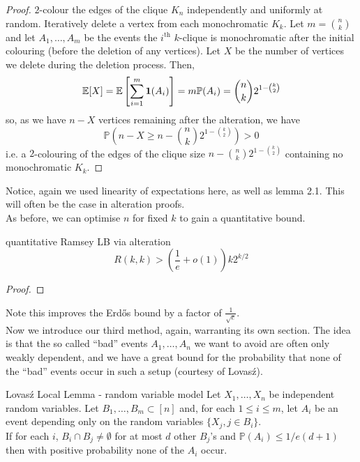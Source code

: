 \documentclass{article}
\begin{document}
\begin{proof}
    $2$-colour the edges of the clique $K_n$ independently and uniformly at random. Iteratively delete a vertex 
    from each monochromatic $K_k$. Let $m = \binom{n}{k}$ and let $A_1, \dots, A_m$ be the events the $i^\text{th}$ 
    $k$-clique is monochromatic after the initial colouring (before the deletion of any vertices). Let $X$ be the 
    number of vertices we delete during the deletion process. Then, 
    \[\mathbb{E}[X] = \mathbb{E}\left[\sum_{i = 1}^m {\bf 1}(A_i)\right] = m\mathbb{P}(A_i) = \binom{n}{k}2^{1-\binom{k}{2}}\]
    so, as we have $n - X$ vertices remaining after the alteration, we have 
    \[\mathbb{P}\left(n - X \geq n - \binom{n}{k}2^{1-\binom{k}{2}}\right) > 0\]
    i.e. a $2$-colouring of the edges of the clique size $n - \binom{n}{k}2^{1-\binom{k}{2}}$ containing no monochromatic 
    $K_k$. 
\end{proof}

Notice, again we used linearity of expectations here, as well as lemma 2.1. This will often be the case in 
alteration proofs. \\ 

As before, we can optimise $n$ for fixed $k$ to gain a quantitative bound.

\begin{proposition}[]{quantitative Ramsey LB via alteration}
    \[R(k, k) > \left(\frac{1}{e} + o(1)\right)k2^{k/2}\]
\end{proposition}

\begin{proof}

\end{proof}

Note this improves the Erd\H{o}s bound by a factor of $\frac{1}{\sqrt{e}}$. \\

Now we introduce our third method, again, warranting its own section. The idea is that the so called ``bad'' events
$A_1, \dots, A_n$ we want to avoid are often only weakly dependent, and we have a great bound for the probability 
that none of the ``bad'' events occur in such a setup (courtesy of Lovas\'{z}).

\begin{lemma}[]{Lovas\'{z} Local Lemma - random variable model}
    Let $X_1, \dots, X_n$ be independent random variables. Let $B_1, \dots, B_m \subset [n]$ and, for each
    $1 \leq i \leq m$, let $A_i$ be an event depending only on the random variables $\{X_j, j \in B_i\}$. \\ 
    
    If for each $i$, $B_i \cap B_j \neq \emptyset$ for at most $d$ other $B_j$'s and $\mathbb{P}(A_i) \leq 1/e(d+1)$ 
    then with positive probability none of the $A_i$ occur. 
\end{lemma}
\end{document}
